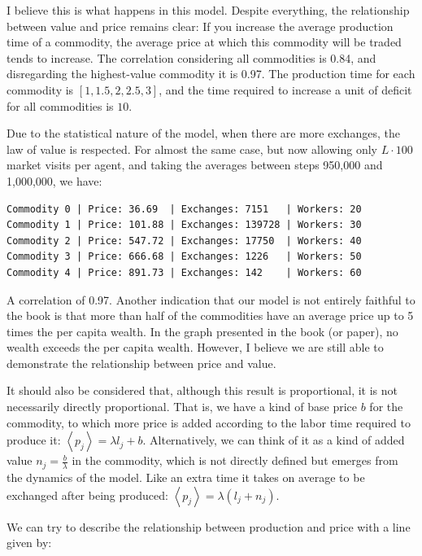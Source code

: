 I believe this is what happens in this model. Despite everything, the relationship between value and price remains clear: If you increase the average production time of a commodity, the average price at which this commodity will be traded tends to increase. The correlation considering all commodities is 0.84, and disregarding the highest-value commodity it is 0.97. The production time for each commodity is $[1,1.5,2,2.5,3]$, and the time required to increase a unit of deficit for all commodities is $10$.

 Due to the statistical nature of the model, when there are more exchanges, the law of value is respected. For almost the same case, but now allowing only $L \cdot 100$ market visits per agent, and taking the averages between steps 950,000 and 1,000,000, we have:



\begin{verbatim}
Commodity 0 | Price: 36.69  | Exchanges: 7151   | Workers: 20
Commodity 1 | Price: 101.88 | Exchanges: 139728 | Workers: 30
Commodity 2 | Price: 547.72 | Exchanges: 17750  | Workers: 40
Commodity 3 | Price: 666.68 | Exchanges: 1226   | Workers: 50
Commodity 4 | Price: 891.73 | Exchanges: 142    | Workers: 60
\end{verbatim}

A correlation of 0.97.  Another indication that our model is not entirely faithful to the book is that more than half of the commodities have an average price up to 5 times the per capita wealth. In the graph presented in the book (or paper), no wealth exceeds the per capita wealth. However, I believe we are still able to demonstrate the relationship between price and value.

It should also be considered that, although this result is proportional, it is not necessarily directly proportional. That is, we have a kind of base price $b$ for the commodity, to which more price is added according to the labor time required to produce it: $\left\langle p_{j}\right\rangle = \lambda l_{j} + b$. Alternatively, we can think of it as a kind of added value $n_{j} = \frac{b}{\lambda}$ in the commodity, which is not directly defined but emerges from the dynamics of the model. Like an extra time it takes on average to be exchanged after being produced: $\left\langle p_{j}\right\rangle = \lambda \left(l_{j} + n_{j}\right)$.  

We can try to describe the relationship between production and price with a line given by:

